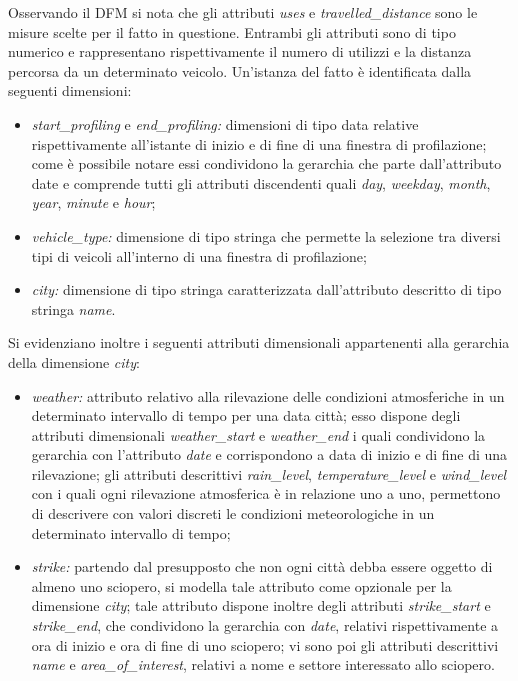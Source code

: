 Osservando il DFM si nota che gli attributi \textit{uses} e \textit{travelled\_distance}
sono le misure scelte per il fatto in questione. Entrambi gli attributi sono di tipo numerico e
rappresentano rispettivamente il numero di utilizzi e la distanza percorsa da un determinato
veicolo.
Un'istanza del fatto è identificata dalla seguenti dimensioni:
\begin{itemize}
\item \textit{start\_profiling} e \textit{end\_profiling:} dimensioni di tipo data relative
rispettivamente all'istante di inizio e di fine di una finestra di profilazione; come è possibile
notare essi condividono la gerarchia che parte dall'attributo date e comprende tutti gli 
attributi discendenti quali \textit{day}, \textit{weekday}, \textit{month}, \textit{year},
\textit{minute} e \textit{hour};
\item \textit{vehicle\_type:} dimensione di tipo stringa che permette la selezione tra diversi
tipi di veicoli all'interno di una finestra di profilazione;
\item \textit{city:} dimensione di tipo stringa caratterizzata dall'attributo descritto di tipo
stringa \textit{name}.
\end{itemize}
Si evidenziano inoltre i seguenti attributi dimensionali appartenenti alla gerarchia della
dimensione \textit{city}:
\begin{itemize}
\item \textit{weather:} attributo relativo alla rilevazione delle condizioni atmosferiche
in un determinato intervallo di tempo per una data città; esso dispone degli attributi
dimensionali \textit{weather\_start} e \textit{weather\_end} i quali condividono la gerarchia
con l'attributo \textit{date} e corrispondono a data di inizio e di fine di una rilevazione;
gli attributi descrittivi \textit{rain\_level}, \textit{temperature\_level} e
\textit{wind\_level} con i quali ogni rilevazione atmosferica è in relazione uno a uno,
permettono di descrivere con valori discreti le condizioni meteorologiche in un determinato
intervallo di tempo;
\item \textit{strike:} partendo dal presupposto che non ogni città debba essere oggetto di
almeno uno sciopero, si modella tale attributo come opzionale per la dimensione \textit{city};
tale attributo dispone inoltre degli attributi \textit{strike\_start} e \textit{strike\_end},
che condividono la gerarchia con \textit{date}, relativi rispettivamente a 
ora di inizio e ora di fine di uno sciopero; vi sono poi gli attributi descrittivi \textit{name} e 
\textit{area\_of\_interest}, relativi a nome e settore interessato allo sciopero.
\end{itemize}

